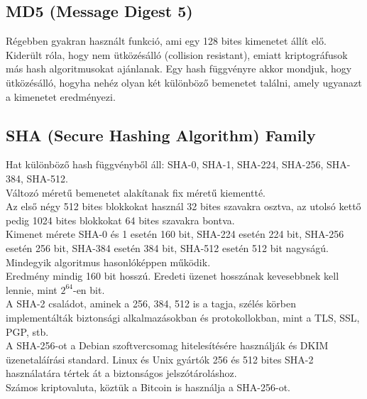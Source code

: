 \subsection{MD5 (Message Digest 5)}
Régebben gyakran használt funkció, ami egy 128 bites kimenetet állít elő.
\vspace{5pt} \\Kiderült róla, hogy nem ütközésálló (collision resistant), emiatt kriptográfusok más hash algoritmusokat ajánlanak. Egy hash függvényre akkor mondjuk, hogy ütközésálló, hogyha nehéz olyan két különböző bemenetet találni, amely ugyanazt a kimenetet eredményezi.


\subsection{SHA (Secure Hashing Algorithm) Family}
Hat különböző hash függvényből áll: SHA-0, SHA-1, SHA-224, SHA-256, SHA-384, SHA-512.
\vspace{5pt} \\Változó méretű bemenetet alakítanak fix méretű kiementté.
\vspace{5pt} \\Az első négy 512 bites blokkokat használ 32 bites szavakra osztva, az utolsó kettő pedig 1024 bites blokkokat 64 bites szavakra bontva.
\vspace{5pt} \\Kimenet mérete SHA-0 és 1 esetén 160 bit, SHA-224 esetén 224 bit, SHA-256 esetén 256 bit, SHA-384 esetén 384 bit, SHA-512 esetén 512 bit nagyságú.
\vspace{5pt} \\Mindegyik algoritmus hasonlóképpen működik.
\vspace{5pt} \\Eredmény mindig 160 bit hosszú. Eredeti üzenet hosszának kevesebbnek kell lennie, mint $2^{64}$-en bit.
\vspace{5pt} \\A SHA-2 családot, aminek a 256, 384, 512 is a tagja, szélés körben implementálták biztonsági alkalmazásokban és protokollokban, mint a TLS, SSL, PGP, stb.
\vspace{5pt} \\A SHA-256-ot a Debian szoftvercsomag hitelesítésére használják és DKIM üzenetaláírási standard. Linux és Unix gyártók 256 és 512 bites SHA-2 használatára tértek át a biztonságos jelszótároláshoz.
\vspace{5pt} \\Számos kriptovaluta, köztük a Bitcoin is használja a SHA-256-ot.


